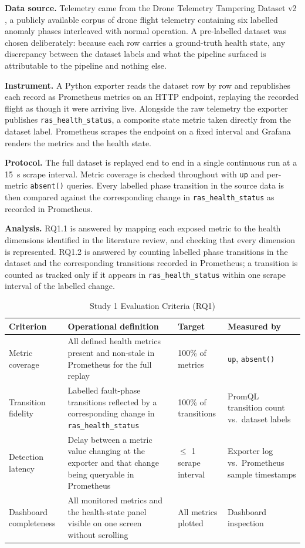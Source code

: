 \noindent\textbf{Data source.} Telemetry came from the Drone Telemetry Tampering
Dataset v2 \citep{ekanayakadevlk2024}, a publicly available corpus of drone
flight telemetry containing six labelled anomaly phases interleaved with normal
operation. A pre-labelled dataset was chosen deliberately: because each row
carries a ground-truth health state, any discrepancy between the dataset labels
and what the pipeline surfaced is attributable to the pipeline and nothing else.

\noindent\textbf{Instrument.} A Python exporter reads the dataset row by row and
republishes each record as Prometheus metrics on an HTTP endpoint, replaying the
recorded flight as though it were arriving live. Alongside the raw telemetry the
exporter publishes \texttt{ras\_health\_status}, a composite state metric taken
directly from the dataset label. Prometheus scrapes the endpoint on a fixed
interval and Grafana renders the metrics and the health state.

\noindent\textbf{Protocol.} The full dataset is replayed end to end in a single
continuous run at a \SI{15}{\second} scrape interval. Metric coverage is checked
throughout with \texttt{up} and per-metric \texttt{absent()} queries. Every
labelled phase transition in the source data is then compared against the
corresponding change in \texttt{ras\_health\_status} as recorded in Prometheus.

\noindent\textbf{Analysis.} RQ1.1 is answered by mapping each exposed metric to
the health dimensions identified in the literature review, and checking that
every dimension is represented. RQ1.2 is answered by counting labelled phase
transitions in the dataset and the corresponding transitions recorded in
Prometheus; a transition is counted as tracked only if it appears in
\texttt{ras\_health\_status} within one scrape interval of the labelled change.

\begin{table}[htbp]
\centering
\caption{Study 1 Evaluation Criteria (RQ1)}
\label{tab:eval-rq1}
\small
\begin{tabular}{|p{2.8cm}|p{5.4cm}|p{2.6cm}|p{3.0cm}|}
\hline
\textbf{Criterion} & \textbf{Operational definition} & \textbf{Target} & \textbf{Measured by} \\
\hline
Metric coverage & All defined health metrics present and non-stale in Prometheus for the full replay & 100\% of metrics & \texttt{up}, \texttt{absent()} \\
\hline
Transition fidelity & Labelled fault-phase transitions reflected by a corresponding change in \texttt{ras\_health\_status} & 100\% of transitions & PromQL transition count vs.\ dataset labels \\
\hline
Detection latency & Delay between a metric value changing at the exporter and that change being queryable in Prometheus & $\leq$ 1 scrape interval & Exporter log vs.\ Prometheus sample timestamps \\
\hline
Dashboard completeness & All monitored metrics and the health-state panel visible on one screen without scrolling & All metrics plotted & Dashboard inspection \\
\hline
\end{tabular}
\end{table}

